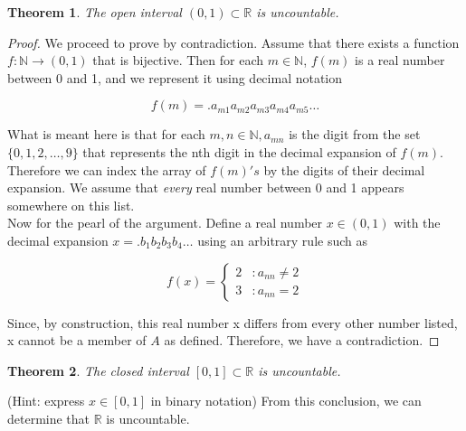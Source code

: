 \documentclass{tufte-book}
\newtheorem{theorem}{Theorem}[chapter]
\theoremstyle{definition}
\numberwithin{section}{chapter}
\begin{document}
\begin{theorem} The open interval $(0,1) \subset \mathbb{R}$ is uncountable.    \end{theorem}


\begin{proof}
We proceed to prove by contradiction.  Assume that there exists a function $f: \mathbb{N} \to (0,1)$ that is bijective.  Then for each $m \in \mathbb{N}$, $f(m)$ is a real number between 0 and 1, and we represent it using decimal notation

\[f(m) = .a_{m1}a_{m2}a_{m3}a_{m4}a_{m5} \ldots\]


What is meant here is that for each $m,n \in \mathbb{N}, a_{mn}$ is the digit from the set $\{0,1,2, \ldots, 9\}$ that represents the nth digit in the decimal expansion of $f(m)$.  Therefore we can index the array of $f(m)'s$ by the digits of their decimal expansion.   We assume that \emph{every} real number between 0 and 1 appears somewhere on this list.\\

Now for the pearl of the argument.   Define a real number $x \in (0,1)$  with the decimal expansion $x=.b_1 b_2 b_3 b_4 \ldots$ using an arbitrary rule such as 

 \begin{displaymath}
   f(x) = \left\{
     \begin{array}{lr}
       2 & : a_{nn} \neq 2 \\
       3 & : a_{nn} = 2
     \end{array}
   \right.
 \end{displaymath} 
   
   
   Since, by construction, this real number x differs from every other number listed, x cannot be a member of $A$ as defined.  Therefore, we have a contradiction.
   
\end{proof}

\begin{theorem} The closed interval $[0,1] \subset \mathbb{R}$ is uncountable.  \end{theorem}
  (Hint: express $x \in [0,1]$ in binary notation)   From this conclusion, we can determine that $\mathbb{R}$ is uncountable.  
\end{document}
